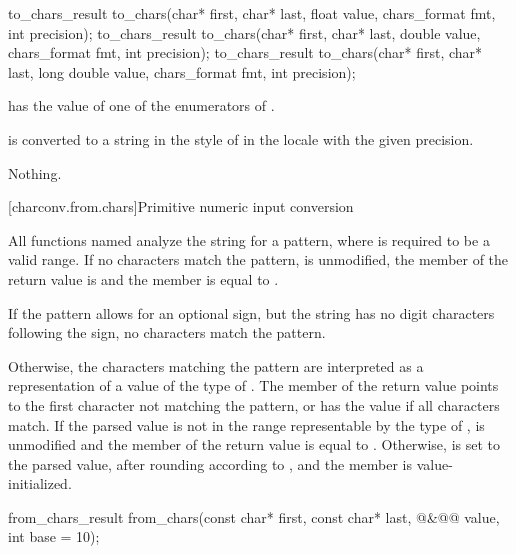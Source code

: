 %
\begin{itemdecl}
to_chars_result to_chars(char* first, char* last, float value,
                         chars_format fmt, int precision);
to_chars_result to_chars(char* first, char* last, double value,
                         chars_format fmt, int precision);
to_chars_result to_chars(char* first, char* last, long double value,
                         chars_format fmt, int precision);
\end{itemdecl}

\begin{itemdescr}
\pnum
\expects
{} has the value of
one of the enumerators of .

\pnum
\effects
{} is converted to a string
in the style of 
in the  locale
with the given precision.

\pnum
\throws
Nothing.
\end{itemdescr}


[charconv.from.chars]{Primitive numeric input conversion}

\pnum
All functions named 
analyze the string 
for a pattern,
where  is required to be a valid range.
If no characters match the pattern,
 is unmodified,
the member  of the return value is  and
the member  is equal to .
\begin{note}
If the pattern allows for an optional sign,
but the string has no digit characters following the sign,
no characters match the pattern.
\end{note}
Otherwise,
the characters matching the pattern
are interpreted as a representation
of a value of the type of .
The member 
of the return value
points to the first character
not matching the pattern,
or has the value 
if all characters match.
If the parsed value
is not in the range
representable by the type of ,
 is unmodified and
the member  of the return value
is equal to .
Otherwise,
 is set to the parsed value,
after rounding according to , and
the member  is value-initialized.

%
\begin{itemdecl}
from_chars_result from_chars(const char* first, const char* last,
                             @\seebelow@&@\itcorr[-1]@ value, int base = 10);
\end{itemdecl}

